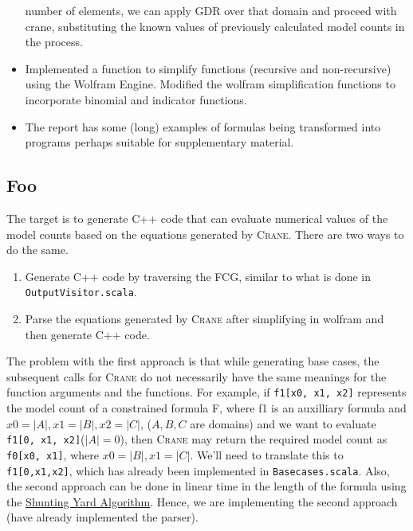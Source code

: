 \documentclass{article}
\begin{document}
\begin{itemize}
        number of elements, we can apply GDR over that domain and proceed with
        crane, substituting the known values of previously calculated model
        counts in the process.
  \item Implemented a function to simplify functions (recursive and
        non-recursive) using the Wolfram Engine. Modified the wolfram
        simplification functions to incorporate binomial and indicator
        functions.
  \item The report has some (long) examples of formulas being transformed into
        programs perhaps suitable for supplementary material.
\end{itemize}

\subsection{Foo}

The target is to generate C++ code that can evaluate numerical values of the
model counts based on the equations generated by \textsc{Crane}. There are two
ways to do the same.
\begin{enumerate}
  \item Generate C++ code by traversing the FCG, similar to what is done in
        \texttt{OutputVisitor.scala}.
  \item Parse the equations generated by \textsc{Crane} after simplifying in
        wolfram and then generate C++ code.
\end{enumerate}

The problem with the first approach is that while generating base cases, the
subsequent calls for \textsc{Crane} do not necessarily have the same meanings
for the function arguments and the functions. For example, if \texttt{f1[x0, x1,
  x2]} represents the model count of a constrained formula F, where f1 is an
auxilliary formula and $x0 = |A|, x1 = |B|, x2 = |C|$, ($A,B,C$ are domains) and
we want to evaluate \texttt{f1[0, x1, x2]}($|A| = 0$), then \textsc{Crane} may
return the required model count as \texttt{f0[x0, x1]}, where
$x0 = |B|, x1 = |C|$. We'll need to translate this to \texttt{f1[0,x1,x2]},
which has already been implemented in \texttt{Basecases.scala}. Also, the second
approach can be done in linear time in the length of the formula using
the
\href{https://en.wikipedia.org/wiki/Shunting_yard_algorithm#:~:text=In%20computer%20science%2C%20the%20shunting,abstract%20syntax%20tree%20(AST).}{Shunting
  Yard Algorithm}. Hence, we are implementing the second approach (have already
implemented the parser).
\end{document}
